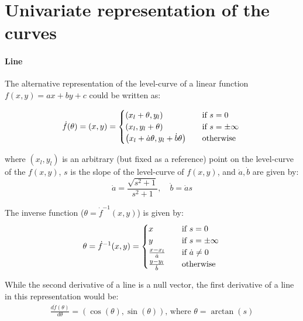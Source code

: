 \section{Univariate representation of the curves} \label{app:alternativeRep}

\paragraph{Line}
The alternative representation of the level-curve of a linear function $f(x,y)=ax+by+c$ could be written as:

\[
\dot{f}(\theta) = (x,y) =
\begin{cases}
  \left( x_l + \theta, y_l \right) & \quad \text{if } s = 0\\
  \left( x_l, y_l + \theta \right) & \quad \text{if } s = \pm \infty\\
  \left( x_l + \dot{a}\theta , y_l + \dot{b}\theta \right) & \quad \text{otherwise} \\
\end{cases}\\
\]

where $(x_l,y_l)$ is an arbitrary (but fixed as a reference) point on the level-curve of the $f(x,y)$, $s$ is the slope of the level-curve of $f(x,y)$, and $\dot{a}, \dot{b}$ are given by:
\[
\dot{a} = \frac{\sqrt{ s^2 + 1}}{s^2 + 1}, \quad \dot{b} = \dot{a}s
\]

The inverse function ($\theta = \dot{f}^{-1}(x,y)$) is given by:
\[
\theta = \dot{f}^{-1}(x,y) =
\begin{cases}
  x & \quad \text{if } s = 0\\
  y & \quad \text{if } s = \pm \infty\\
  \frac{x-x_l}{\dot{a}} & \quad \text{if } \dot{a} \neq 0\\
  \frac{y-y_l}{\dot{b}} & \quad \text{otherwise} \\
\end{cases}\\
\]

While the second derivative of a line is a null vector, the first derivative of a line in this representation would be:
\[
\begin{array}{l}
  \frac{d\dot{f}(\theta)}{d\theta} = \left( \cos(\theta) , \sin(\theta) \right) \text{, where } \theta = \arctan(s)\\
\end{array}
\]



